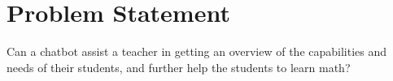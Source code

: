 \section{Problem Statement}
\label{sec:problem_statement}
Can a chatbot assist a teacher in getting an overview of the capabilities and needs of their students, and further help the students to learn math?


\begin{comment}
\newline\indent

Can a chatbot assist students to achieve higher academic level and provide teachers with a better overview of the capabilities and needs of their students?

Can a chatbot assist the teacher in providing the students with the help they need, and get a better overview of the capabilities and needs of the students.

\enquote{Is it possible to help the teachers gain a better overview of the students capabilities and give students an easily usable tool to further their education through the help of a chatbot?}

Can a chatbot be used to assist teachers in their evaluation of student capabilities as well as play the role of an assistant in regards to providing information to students?

Is it possible to create a chatbot that fulfills the role of an assistant teacher in regards to student 
evaluation and student assistance?
\end{comment}

